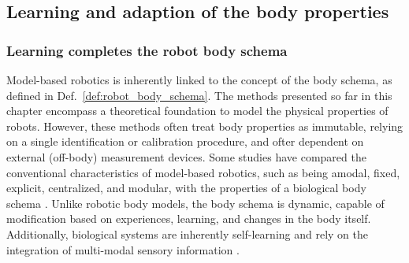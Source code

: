 
\subsection{Learning and adaption of the body properties}

\subsubsection{Learning completes the robot body schema}
Model-based robotics is inherently linked to the concept of the body schema, as defined in Def.~\ref{def:robot_body_schema}. The methods presented so far in this chapter encompass a theoretical foundation to model the physical properties of robots. However, these methods often treat body properties as immutable, relying on a single identification or calibration procedure, and ofter dependent on external (off-body) measurement devices. Some studies have compared the conventional characteristics of model-based robotics, such as being amodal, fixed, explicit, centralized, and modular, with the properties of a biological body schema \cite{Hoffmann2021Bodymodelshumans}. Unlike robotic body models, the body schema is dynamic, capable of modification based on experiences, learning, and changes in the body itself. Additionally, biological systems are inherently self-learning and rely on the integration of multi-modal sensory information \cite{Asada2018168Proprioceptionbodyschema}.

